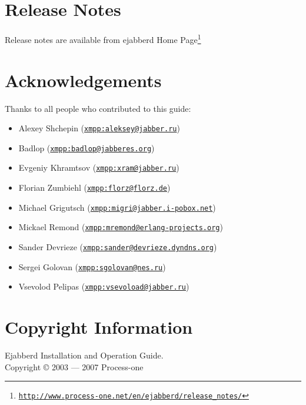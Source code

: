 \documentclass[a4paper,10pt]{book}
\newcommand{\ind}[1]{\begin{latexonly}\index{#1}\end{latexonly}}
\gdef\ahrefurl#1{\href{#1}{\texttt{#1}}}
\gdef\footahref#1#2{#2\footnote{\href{#1}{\texttt{#1}}}}
\begin{document}

\chapter{Release Notes}
\label{releasenotes}
\ind{release notes}

Release notes are available from \footahref{http://www.process-one.net/en/ejabberd/release\_notes/}{ejabberd Home Page}

\chapter{Acknowledgements}
\label{acknowledgements}
Thanks to all people who contributed to this guide:
\begin{itemize}
\item Alexey Shchepin (\ahrefurl{xmpp:aleksey@jabber.ru})
\item Badlop (\ahrefurl{xmpp:badlop@jabberes.org})
\item Evgeniy Khramtsov (\ahrefurl{xmpp:xram@jabber.ru})
\item Florian Zumbiehl (\ahrefurl{xmpp:florz@florz.de})
\item Michael Grigutsch (\ahrefurl{xmpp:migri@jabber.i-pobox.net})
\item Mickael Remond (\ahrefurl{xmpp:mremond@erlang-projects.org})
\item Sander Devrieze (\ahrefurl{xmpp:sander@devrieze.dyndns.org})
\item Sergei Golovan (\ahrefurl{xmpp:sgolovan@nes.ru})
\item Vsevolod Pelipas (\ahrefurl{xmpp:vsevoload@jabber.ru})
\end{itemize}


\chapter{Copyright Information}
\label{copyright}

Ejabberd Installation and Operation Guide.\\
Copyright \copyright{} 2003 --- 2007 Process-one
\end{document}
